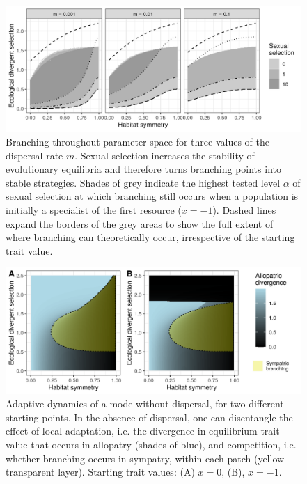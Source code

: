 \begin{figure}

    \centering
    \includegraphics[width=\textwidth]{figures/map_branching_points}
    \caption{Branching throughout parameter space for three values of the dispersal rate $m$. Sexual selection increases the stability of evolutionary equilibria and therefore turns branching points into stable strategies. Shades of grey indicate the highest tested level $\alpha$ of sexual selection at which branching still occurs when a population is initially a specialist of the first resource ($x = -1$). Dashed lines expand the borders of the grey areas to show the full extent of where branching can theoretically occur, irrespective of the starting trait value.}
    \label{fig:map_branching_points}
    
\end{figure}

\begin{figure}

    \centering
    \includegraphics[width=\textwidth]{figures/divergence_across_patches}
    \caption{Adaptive dynamics of a mode without dispersal, for two different starting points. In the absence of dispersal, one can disentangle the effect of local adaptation, i.e. the divergence in equilibrium trait value that occurs in allopatry (shades of blue), and competition, i.e. whether branching occurs in sympatry, within each patch (yellow transparent layer). Starting trait values: (A) $x = 0$, (B), $x = -1$.}
    \label{fig:map_divergence}
    
\end{figure}